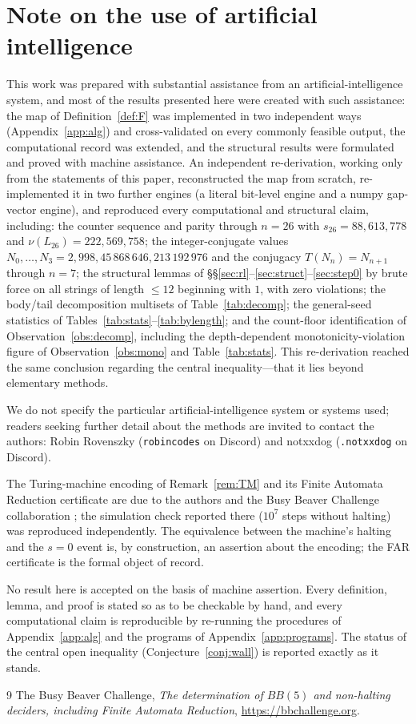 \documentclass[11pt,reqno]{amsart}
\theoremstyle{plain}
\theoremstyle{definition}
\theoremstyle{remark}
\begin{document}
\section{Note on the use of artificial intelligence}\label{app:ai}
This work was prepared with substantial assistance from an artificial-intelligence system, and most of the results presented here were created with such assistance: the map of Definition~\ref{def:F} was implemented in two independent ways (Appendix~\ref{app:alg}) and cross-validated on every commonly feasible output, the computational record was extended, and the structural results were formulated and proved with machine assistance. An independent re-derivation, working only from the statements of this paper, reconstructed the map from scratch, re-implemented it in two further engines (a literal bit-level engine and a numpy gap-vector engine), and reproduced every computational and structural claim, including: the counter sequence and parity through $n=26$ with $s_{26}=88{,}613{,}778$ and $\nu(L_{26})=222{,}569{,}758$; the integer-conjugate values $N_0,\dots,N_3=2,998,45\,868\,646,213\,192\,976$ and the conjugacy $T(N_n)=N_{n+1}$ through $n=7$; the structural lemmas of \S\S\ref{sec:rl}--\ref{sec:struct}--\ref{sec:step0} by brute force on all strings of length $\le 12$ beginning with $1$, with zero violations; the body/tail decomposition multisets of Table~\ref{tab:decomp}; the general-seed statistics of Tables~\ref{tab:stats}--\ref{tab:bylength}; and the count-floor identification of Observation~\ref{obs:decomp}, including the depth-dependent monotonicity-violation figure of Observation~\ref{obs:mono} and Table~\ref{tab:stats}. This re-derivation reached the same conclusion regarding the central inequality---that it lies beyond elementary methods.

We do not specify the particular artificial-intelligence system or systems used; readers seeking further detail about the methods are invited to contact the authors: Robin Rovenszky (\texttt{robincodes} on Discord) and notxxdog (\texttt{.notxxdog} on Discord).

The Turing-machine encoding of Remark~\ref{rem:TM} and its Finite Automata Reduction certificate are due to the authors and the Busy Beaver Challenge collaboration \cite{bbc}; the simulation check reported there ($10^7$ steps without halting) was reproduced independently. The equivalence between the machine's halting and the $s=0$ event is, by construction, an assertion about the encoding; the FAR certificate is the formal object of record.

No result here is accepted on the basis of machine assertion. Every definition, lemma, and proof is stated so as to be checkable by hand, and every computational claim is reproducible by re-running the procedures of Appendix~\ref{app:alg} and the programs of Appendix~\ref{app:programs}. The status of the central open inequality (Conjecture~\ref{conj:wall}) is reported exactly as it stands.

\begin{thebibliography}{9}
 The Busy Beaver Challenge, \emph{The determination of $BB(5)$ and non-halting deciders, including Finite Automata Reduction}, \url{https://bbchallenge.org}.
\end{thebibliography}
\end{document}
